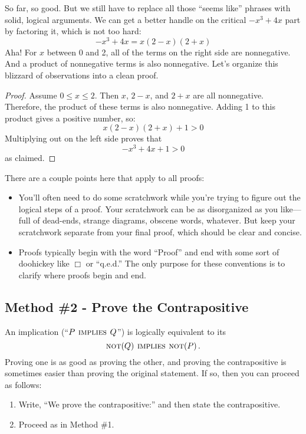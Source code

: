 So far, so good.  But we still have to replace all those ``seems
like'' phrases with solid, logical arguments.  We can get a better
handle on the critical $-x^3 + 4x$ part by factoring it, which is not
too hard:
%
\[
-x^3 + 4x = x (2 - x)(2 + x)
\]
%
Aha!  For $x$ between 0 and 2, all of the terms on the right side are
nonnegative.  And a product of nonnegative terms is also nonnegative.
Let's organize this blizzard of observations into a clean proof.

\begin{proof}
Assume $0 \leq x \leq 2$.  Then $x$, $2 - x$, and $2 + x$ are all
nonnegative.  Therefore, the product of these terms is also
nonnegative.  Adding 1 to this product gives a positive number, so:
%
\[
x (2 - x)(2 + x) + 1 > 0
\]
%
Multiplying out on the left side proves that
%
\[
-x^3 + 4x + 1 > 0
\]
%
as claimed.
\end{proof}

There are a couple points here that apply to all proofs:
%
\begin{itemize}

\item You'll often need to do some scratchwork while you're trying to
figure out the logical steps of a proof.  Your scratchwork can be as
disorganized as you like---full of dead-ends, strange diagrams,
obscene words, whatever.  But keep your scratchwork separate from your
final proof, which should be clear and concise.

\item Proofs typically begin with the word ``Proof'' and end with some
sort of doohickey like $\Box$ or ``q.e.d.''  The only purpose for
these conventions is to clarify where proofs begin and end.

\end{itemize}

\subsection{Method \#2 - Prove the Contrapositive}

An implication (``$P \mathbin{\mathrm{\textsc{\,implies\,}}} Q$'') is logically equivalent to its
\[
\mathop{\mathrm{\textsc{not}}}(Q) \mathbin{\mathrm{\textsc{\,implies\,}}} \mathop{\mathrm{\textsc{not}}}(P)\,.
\]
Proving one is as good as proving the other, and proving the
contrapositive is sometimes easier than proving the original statement.
If so, then you can proceed as follows:
%
\begin{enumerate}
\item Write, ``We prove the contrapositive:'' and then state the
contrapositive.
\item Proceed as in Method \#1.
\end{enumerate}

